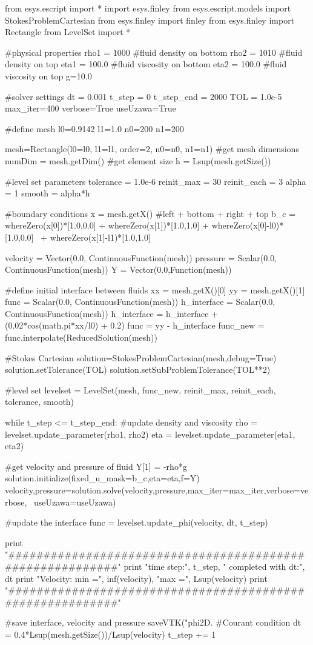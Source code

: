 \begin{python}

from esys.escript import *
import esys.finley
from esys.escript.models import StokesProblemCartesian
from esys.finley import finley
from esys.finley import Rectangle
from LevelSet import *

#physical properties
rho1 = 1000		#fluid density on bottom
rho2 = 1010		#fluid density on top
eta1 = 100.0		#fluid viscosity on bottom
eta2 = 100.0		#fluid viscosity on top
g=10.0

#solver settings
dt = 0.001
t_step = 0
t_step_end = 2000
TOL = 1.0e-5
max_iter=400
verbose=True
useUzawa=True

#define mesh
l0=0.9142
l1=1.0
n0=200      
n1=200

mesh=Rectangle(l0=l0, l1=l1, order=2, n0=n0, n1=n1)
#get mesh dimensions
numDim = mesh.getDim()
#get element size
h = Lsup(mesh.getSize())

#level set parameters
tolerance = 1.0e-6
reinit_max = 30
reinit_each = 3
alpha = 1
smooth = alpha*h 

#boundary conditions
x = mesh.getX()
#left + bottom + right + top
b_c = whereZero(x[0])*[1.0,0.0] + whereZero(x[1])*[1.0,1.0] + whereZero(x[0]-l0)*[1.0,0.0] \
      + whereZero(x[1]-l1)*[1.0,1.0]

velocity = Vector(0.0, ContinuousFunction(mesh))
pressure = Scalar(0.0, ContinuousFunction(mesh))
Y = Vector(0.0,Function(mesh))

#define initial interface between fluids
xx = mesh.getX()[0]
yy = mesh.getX()[1]
func = Scalar(0.0, ContinuousFunction(mesh))
h_interface = Scalar(0.0, ContinuousFunction(mesh))
h_interface = h_interface + (0.02*cos(math.pi*xx/l0) + 0.2)
func = yy - h_interface
func_new = func.interpolate(ReducedSolution(mesh))

#Stokes Cartesian
solution=StokesProblemCartesian(mesh,debug=True)
solution.setTolerance(TOL)
solution.setSubProblemTolerance(TOL**2)

#level set
levelset = LevelSet(mesh, func_new, reinit_max, reinit_each, tolerance, smooth)    

while t_step <= t_step_end:
  #update density and viscosity
  rho = levelset.update_parameter(rho1, rho2)
  eta = levelset.update_parameter(eta1, eta2)

  #get velocity and pressure of fluid
  Y[1] = -rho*g
  solution.initialize(fixed_u_mask=b_c,eta=eta,f=Y)
  velocity,pressure=solution.solve(velocity,pressure,max_iter=max_iter,verbose=verbose, \ 
  useUzawa=useUzawa)
  
  #update the interface
  func = levelset.update_phi(velocity, dt, t_step)  

  print "##########################################################"
  print "time step:", t_step, " completed with dt:", dt
  print "Velocity: min =", inf(velocity), "max =", Lsup(velocity)
  print "##########################################################"
 
  #save interface, velocity and pressure 
  saveVTK("phi2D.%
  #Courant condition
  dt = 0.4*Lsup(mesh.getSize())/Lsup(velocity)
  t_step += 1

\end{python}
